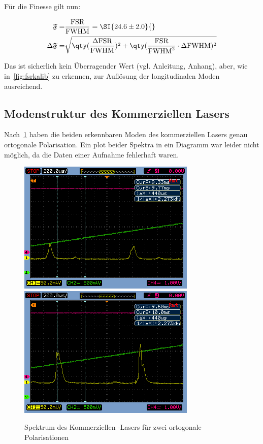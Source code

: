 \documentclass[slug=GL, room=HZDR\ Dresden/Rossendorf\,\ Geb.\ 620/123, supervisor=Tim\ Ziegler]{../../Lab_Report_LaTeX/lab_report}
\newcommand{\hne}{\ce{HeNe}-Laser}
\begin{document}
F\"ur die Finesse gilt nun:

\begin{align}
  \label{eq:finesselaser}
  \mathfrak{F} =& \frac{\text{FSR}}{\text{FWHM}}=\SI{24.6\pm 2.0}{} \\
  \Delta\mathfrak{F} =&
  \sqrt{\qty(\frac{\Delta\text{FSR}}{\text{FWHM}})^2 + \qty(\frac{\text{FSR}}{\text{FWHM}^2}\cdot\Delta\text{FWHM})^2}
\end{align}

Das ist sicherlich kein \"Uberragender Wert (vgl. Anleitung, Anhang),
aber, wie in~\ref{fig:fsrkalib} zu erkennen, zur Aufl\"osung der
longitudinalen Moden ausreichend.

\subsection{Modenstruktur des Kommerziellen Lasers}
\label{sec:modkomm}
Nach~\ref{fig:polarisations} haben die beiden erkennbaren Moden des
kommerziellen Lasers genau ortogonale Polarisation. Ein plot beider
Spektra in ein Diagramm war leider nicht m\"oglich, da die Daten einer
Aufnahme fehlerhaft waren.


\label{sec:modsturkom}
\begin{figure}[b]\centering
  \includegraphics[width=.3\columnwidth]{pol1.png}
  \includegraphics[width=.3\columnwidth]{pol2.png}
  \caption[Gauss]{Spektrum des Kommerziellen \hne{}s f\"ur zwei
    ortogonale Polarisationen}
  \label{fig:polarisations}
\end{figure}
\end{document}
